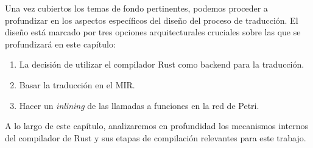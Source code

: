 Una vez cubiertos los temas de fondo pertinentes, podemos proceder a profundizar en los
aspectos específicos del diseño del proceso de traducción. El diseño está marcado por tres
opciones arquitecturales cruciales sobre las que se profundizará en este capítulo:

\begin{enumerate}
    \item La decisión de utilizar el compilador Rust como backend para la traducción.
    \item Basar la traducción en el \acrfull{MIR}.
    \item Hacer un \textit{inlining} de las llamadas a funciones en la red de Petri.
\end{enumerate}

A lo largo de este capítulo, analizaremos en profundidad los mecanismos internos del
compilador de Rust y sus etapas de compilación relevantes para este trabajo.